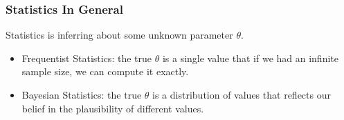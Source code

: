 \documentclass[slides]{beamer}
\newcommand{\blue}[1]{\textcolor{blue2}{#1}}
\begin{document}
%
%
%



\begin{frame}[fragile]
\frametitle{Statistics In General}
Statistics is inferring about some unknown parameter $\theta$.

\begin{itemize}
\pause\item \blue{Frequentist Statistics}:  the true $\theta$ is a single value that if we had an infinite sample size, we can compute it exactly. 
\pause\item \blue{Bayesian Statistics}:  the true $\theta$ is a \blue{distribution} of values that reflects our \blue{belief} in the plausibility of different values.
\end{itemize}

\end{frame}
\end{document}
